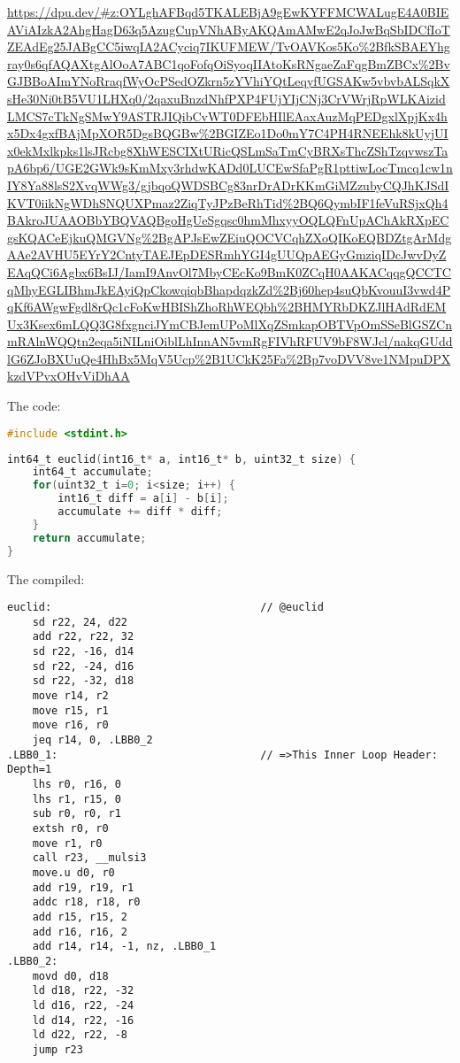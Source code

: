 \begin{sloppypar}
\url{https://dpu.dev/#z:OYLghAFBqd5TKALEBjA9gEwKYFFMCWALugE4A0BIEAViAIzkA2AhgHagD63q5AzugCupVNhAByAKQAmAMwE2qJoJwBqSbIDCfIoTZEAdEg25JABgCC5iwqIA2ACyciq7IKUFMEW/TvOAVKos5Ko%2BfkSBAEYhgray0s6qfAQAXtgAlOoA7ABC1qoFofqOiSyoqIIAtoKsRNgaeZaFqgBmZBCx%2BvGJBBoAImYNoRraqfWyOcPSedOZkrn5zYVhiYQtLeqyfUGSAKw5vbvbALSqkXsHe30Ni0tB5VU1LHXq0/2qaxuBnzdNhfPXP4FUjYIjCNj3CrVWrjRpWLKAizidLMCS7cTkNgSMwY9ASTRJIQibCvWT0DFEbHIlEAaxAuzMqPEDgxlXpjKx4hx5Dx4gxfBAjMpXOR5DgsBQGBw%2BGIZEo1Do0mY7C4PH4RNEEhk8kUyjUIx0ekMxlkpks1lsJRcbg8XhWESCIXtURicQSLmSaTmCyBRXsThcZShTzqvwszTapA6bp6/UGE2GWk9sKmMxy3rhdwKADd0LUCEwSfaPgR1pttiwLocTmcq1cw1nIY8Ya88lsS2XvqWWg3/gjbqoQWDSBCg83nrDrADrKKmGiMZzubyCQJhKJSdIKVT0iikNgWDhSNQUXPmaz2ZiqTyJPzBeRhTid%2BQ6QymbIF1feVuRSjxQh4BAkroJUAAOBbYBQVAQBgoHgUeSgqsc0hmMhxyyOQLQFnUpAChAkRXpECgsKQACeEjkuQMGVNg%2BgAPJsEwZEiuQOCVCqhZXoQIKoEQBDZtgArMdgAAe2AVHU5EYrY2CntyTAEJEpDESRmhYGI4gUUQpAEGyGmziqIDcJwvDyZEAqQCi6Agbx6BsIJ/IamI9AnvOl7MbyCEcKo9BmK0ZCqH0AAKACqqgQCCTCqMhyEGLIBhmJkEAyiQpCkowqiqbBhapdqzkZd%2Bj60hep4suQbKvouuI3vwd4PqKf6AWgwFgdl8rQc1cFoKwHBIShZhoRhWEQbh%2BHMYRbDKZJlHAdRdEMUx3Ksex6mLQQ3G8fxgnciJYmCBJemUPoMlXqZSmkapOBTVpOmSSeBlGSZCnmRAlnWQQtn2eqa5iNILniOiblLhInnAN5vmRgFIVhRFUV9bF8WJcl/nakqGUddlG6ZJoBXUuQe4HhBx5MqV5Ucp%2B1UCkK25Fa%2Bp7voDVV8ve1NMpuDPXkzdVPvxOHvViDhAA}
\end{sloppypar}

The code:
\lstset{
   showlines=true
}
\begin{lstlisting}[language=C]
#include <stdint.h>

\end{lstlisting}
\vspace{-\baselineskip}
\begin{lstlisting}[language=C, backgroundcolor=\color{light-green}]
int64_t euclid(int16_t* a, int16_t* b, uint32_t size) {
    int64_t accumulate;
    for(uint32_t i=0; i<size; i++) {
        int16_t diff = a[i] - b[i];
        accumulate += diff * diff;
    }
    return accumulate;
}
\end{lstlisting}

The compiled:
\begin{lstlisting}[language={[x86masm]Assembler}]
    euclid:                                 // @euclid
    sd r22, 24, d22
    add r22, r22, 32
    sd r22, -16, d14
    sd r22, -24, d16
    sd r22, -32, d18
    move r14, r2
    move r15, r1
    move r16, r0
    jeq r14, 0, .LBB0_2
.LBB0_1:                                // =>This Inner Loop Header: Depth=1
    lhs r0, r16, 0
    lhs r1, r15, 0
    sub r0, r0, r1
    extsh r0, r0
    move r1, r0
    call r23, __mulsi3
    move.u d0, r0
    add r19, r19, r1
    addc r18, r18, r0
    add r15, r15, 2
    add r16, r16, 2
    add r14, r14, -1, nz, .LBB0_1
.LBB0_2:
    movd d0, d18
    ld d18, r22, -32
    ld d16, r22, -24
    ld d14, r22, -16
    ld d22, r22, -8
    jump r23
\end{lstlisting}